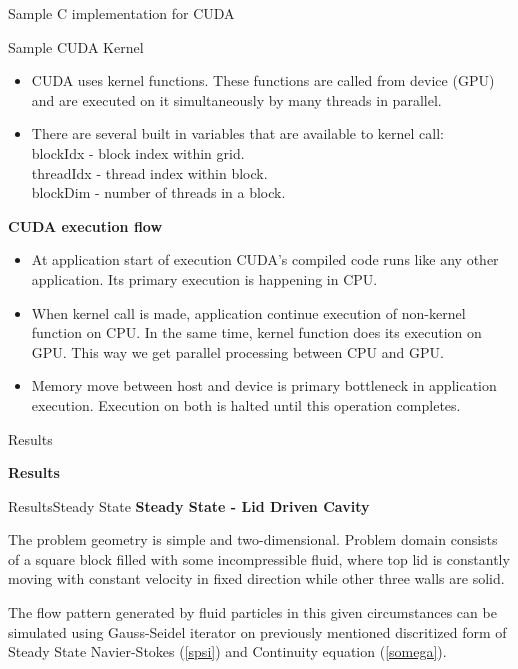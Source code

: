 \documentclass[11pt]{beamer}
\begin{document}
\begin{frame}
Sample C implementation for CUDA
\lstII

\end{frame}

\begin{frame}
Sample CUDA Kernel\\
\lstIII
\begin{itemize}
\item CUDA uses kernel functions. These functions are called from device (GPU) and are executed on it simultaneously by many threads in parallel.
\item There are several built in variables that are available to kernel call:\\
blockIdx - block index within grid.\\
threadIdx - thread index within block.\\
blockDim - number of threads in a block.
\end{itemize}
\end{frame}


\begin{frame}
\textbf{CUDA execution flow}
\begin{itemize}
\item At application start of execution CUDA's compiled code runs like any other application. Its primary execution is happening in CPU.
\item When kernel call is made, application continue execution of non-kernel function on CPU. In the same time, kernel function does its execution on GPU. This way we get parallel processing between CPU and GPU.  
\item Memory move between host and device is primary bottleneck in application execution. Execution on both is halted until this operation completes.
\end{itemize}
\end{frame}



\begin{frame}{Results}{}
\begin{center}
\textbf{Results}
\end{center}
\end{frame}


\begin{frame}{Results}{Steady State}
\textbf{Steady State - Lid Driven Cavity}\linebreak

The problem geometry is simple and two-dimensional. Problem domain consists of a square block filled with some incompressible fluid, where top lid is constantly moving with constant velocity in fixed direction while other three walls are solid.\linebreak

The flow pattern generated by fluid particles in this given circumstances can be simulated using Gauss-Seidel iterator on previously mentioned discritized form of Steady State Navier-Stokes (\ref{spsi}) and Continuity equation (\ref{somega}).
\end{frame}
\end{document}
